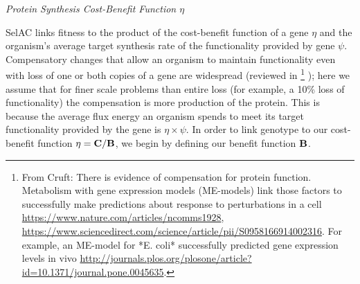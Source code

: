 \documentclass[12pt,letterpaper]{article}
\renewcommand{\subsection}[1]{%
\bigskip
\begin{center}
\begin{large}
\normalfont\itshape #1
\end{large}
\end{center}}
\newcommand{\Cost}{\ensuremath{\text{\textbf{C}}}\xspace}
\newcommand{\Func}{\ensuremath{\text{\textbf{B}}}\xspace}
\newcommand{\selac}{SelAC\xspace}
\begin{document}
\subsection{Protein Synthesis Cost-Benefit Function $\eta$}
\selac links fitness to the product of the cost-benefit function of a gene $\eta$ and the organism's average target synthesis rate of the functionality provided by gene $\psi$.
Compensatory changes that allow an organism to maintain functionality even with loss of one or both copies of a gene are widespread (reviewed in \citet[BRIAN PLEASE COMPLETE OR CUT][]{PLACEHOLDER}\footnote{From Cruft: 
There is evidence of compensation for protein function. Metabolism with gene expression models (ME-models) link those factors to successfully make predictions about response to perturbations in a cell \url{https://www.nature.com/articles/ncomms1928}, \url{https://www.sciencedirect.com/science/article/pii/S0958166914002316}. For example, an ME-model for *E. coli* successfully predicted gene expression levels in vivo \url{http://journals.plos.org/plosone/article?id=10.1371/journal.pone.0045635}.
}
); here we assume that for finer scale problems than entire loss (for example, a 10\% loss of functionality) the compensation is more production of the protein.
This is because the average flux energy an organism spends to meet its target functionality provided by the gene is $\eta \times \psi$.
In order to link genotype to our cost-benefit function $\eta = \Cost/\Func$, we begin by defining our benefit function \Func.
\end{document}
